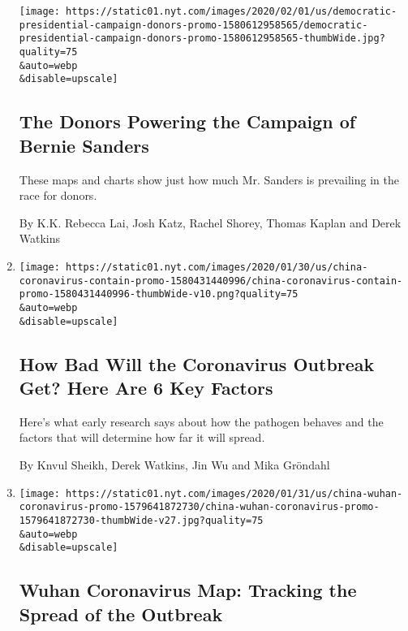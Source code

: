 \begin{enumerate}
  \texttt{[image: https://static01.nyt.com/images/2020/02/01/us/democratic-presidential-campaign-donors-promo-1580612958565/democratic-presidential-campaign-donors-promo-1580612958565-thumbWide.jpg?quality=75\\\&auto=webp\\\&disable=upscale]}

  \hypertarget{the-donors-powering-the-campaign-of-bernie-sanders}{%
  \subsection{The Donors Powering the Campaign of Bernie
  Sanders}\label{the-donors-powering-the-campaign-of-bernie-sanders}}

  These maps and charts show just how much Mr. Sanders is prevailing in
  the race for donors.

  By K.K. Rebecca Lai, Josh Katz, Rachel Shorey, Thomas Kaplan and Derek
  Watkins
\item
  \href{/interactive/2020/world/asia/china-coronavirus-contain.html}{}

  \texttt{[image: https://static01.nyt.com/images/2020/01/30/us/china-coronavirus-contain-promo-1580431440996/china-coronavirus-contain-promo-1580431440996-thumbWide-v10.png?quality=75\\\&auto=webp\\\&disable=upscale]}

  \hypertarget{how-bad-will-the-coronavirus-outbreak-get-here-are-6-key-factors}{%
  \subsection{How Bad Will the Coronavirus Outbreak Get? Here Are 6 Key
  Factors}\label{how-bad-will-the-coronavirus-outbreak-get-here-are-6-key-factors}}

  Here's what early research says about how the pathogen behaves and the
  factors that will determine how far it will spread.

  By Knvul Sheikh, Derek Watkins, Jin Wu and Mika Gröndahl
\item
  \href{/interactive/2020/01/21/world/asia/china-coronavirus-maps.html}{}

  \texttt{[image: https://static01.nyt.com/images/2020/01/31/us/china-wuhan-coronavirus-promo-1579641872730/china-wuhan-coronavirus-promo-1579641872730-thumbWide-v27.jpg?quality=75\\\&auto=webp\\\&disable=upscale]}

  \hypertarget{wuhan-coronavirus-map-tracking-the-spread-of-the-outbreak}{%
  \subsection{Wuhan Coronavirus Map: Tracking the Spread of the
  Outbreak}\label{wuhan-coronavirus-map-tracking-the-spread-of-the-outbreak}}


\end{enumerate}
